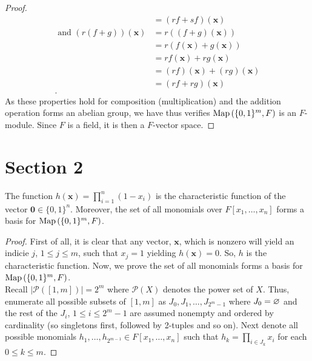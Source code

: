 \begin{proof}
\begin{align*}
									      &= \left( rf + sf \right) \left( \textbf{x} \right)  \\
		\text{ and } \left( r\left( f+g \right)  \right) \left( \textbf{x} \right) &= r\left( \left( f+g \right) \left( \textbf{x} \right)  \right)  \\
											   &= r\left( f\left( \textbf{x} \right) + g\left( \textbf{x} \right)   \right)  \\
											   &= rf\left( \textbf{x} \right)  + rg\left( \textbf{x} \right)  \\
											   &= \left( rf \right) \left( \textbf{x} \right)  + \left( rg \right) \left( \textbf{x} \right)  \\
											   &= \left( rf + rg \right) \left( \textbf{x} \right)  \\
	.\end{align*}
	As these properties hold for composition (multiplication) and the addition operation forms an abelian group, we have thus verifies \(\operatorname{Map}\left( \{0, 1\} ^{m}, F \right) \) is an \(F\)-module. Since \(F\) is a field, it is then a \(F\)-vector space.
\end{proof}
\section{Section 2}
\begin{proposition}
	The function \(h\left( \textbf{x} \right) = \prod_{i= 1}^{n} \left( 1- x_{i} \right) \)	is the characteristic function of the vector \(\textbf{0} \in \{0, 1\} ^{n}\). Moreover, the set of all monomials over \(F\left[ x_1, \ldots, x_{n} \right] \) forms a basis for \(\operatorname{Map}\left( \{0, 1\} ^{m}, F \right) \).
\end{proposition}
\begin{proof}
	First of all, it is clear that any vector, \(\textbf{x}\), which is nonzero will yield an indicie \(j\), \(1 \le j \le m\), such that \(x_{j} = 1\) yielding \(h\left( \textbf{x} \right) = 0\). So, \(h\) is the characteristic function. Now, we prove the set of all monomials forms a basis for \(\operatorname{Map}\left( \{0, 1\} ^{m}, F \right) \).\\
	Recall \(\left| \mathscr{P}\left( \left[ 1, m \right]  \right)  \right| = 2^{m} \) where \(\mathscr{P}\left( X \right) \) denotes the power set of \(X\). Thus, enumerate all possible subsets of \(\left[ 1, m \right] \) as \(J_0, J_1, \ldots, J_{2^{m}-1}\) where \(J_0 = \varnothing\) and the rest of the \(J_{i}\), \(1 \le i \le 2^{m}-1\) are assumed nonempty and ordered by cardinality (so singletons first, followed by 2-tuples and so on). Next denote all possible monomials \(h_1, \ldots, h_{2^{m-1}} \in F\left[ x_1, \ldots , x_{n} \right] \) such that \(h_{k} = \prod_{i \in J_{k}}x_{i}\) for each \(0 \le k \le m\).
\end{proof}
